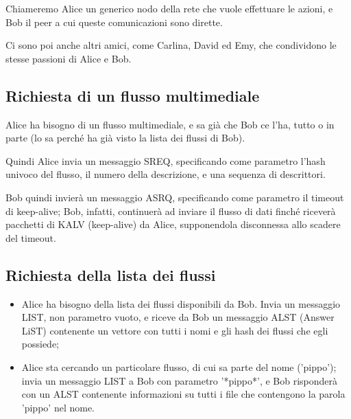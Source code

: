 Chiameremo Alice un generico nodo della rete che vuole effettuare le azioni, e Bob il peer a cui queste comunicazioni sono dirette.



Ci sono poi anche altri amici, come Carlina, David ed Emy, che condividono le stesse passioni di Alice e Bob.






\subsection{Richiesta di un flusso multimediale}
%

Alice ha bisogno di un flusso multimediale, e sa già che Bob ce l'ha, tutto o in parte (lo sa perché ha già visto la lista dei flussi di Bob).



Quindi Alice invia un messaggio SREQ, specificando come parametro l'hash univoco del flusso, il numero della descrizione, e una sequenza di descrittori.



Bob quindi invierà un messaggio ASRQ, specificando come parametro il timeout di keep-alive; Bob, infatti, continuerà ad inviare il flusso di dati finché riceverà pacchetti di KALV (keep-alive) da Alice, supponendola disconnessa allo scadere del timeout. 






\subsection{Richiesta della lista dei flussi}
%

\begin{itemize}
\item Alice ha bisogno della lista dei flussi disponibili da Bob. Invia un messaggio LIST, non parametro vuoto, e riceve da Bob un messaggio ALST (Answer LiST) contenente un vettore con tutti i nomi e gli hash dei flussi che egli possiede;

\item Alice sta cercando un particolare flusso, di cui sa parte del nome ('pippo'); invia un messaggio LIST a Bob con parametro '*pippo*', e Bob risponderà con un ALST contenente informazioni su tutti i file che contengono la parola 'pippo' nel nome.
\end{itemize}




